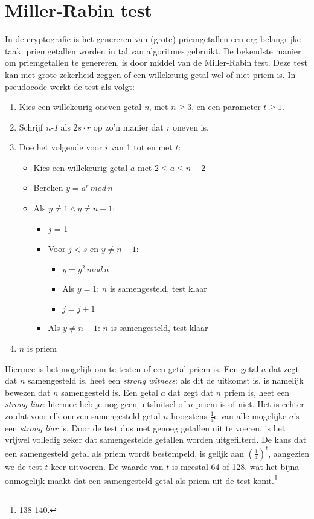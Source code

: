 \documentclass{report} %
\begin{document}
\section{Miller-Rabin test}
In de cryptografie is het genereren van (grote) priemgetallen een erg belangrijke taak: priemgetallen worden in tal van algoritmes gebruikt. De bekendste manier om priemgetallen te genereren, is door middel van de Miller-Rabin test. Deze test kan met grote zekerheid zeggen of een willekeurig getal wel of niet priem is. In pseudocode werkt de test als volgt:
\begin{enumerate}
    \item Kies een willekeurig oneven getal \textit{n}, met $n \geq 3$, en een parameter $t \geq 1$.
    \item Schrijf \textit{n-1} als $2s \cdot r$ op zo’n manier dat \textit{r} oneven is.
    \item Doe het volgende voor $i$ van 1 tot en met $t$:
    \begin{itemize}
        \item Kies een willekeurig getal $a$ met $2 \leq a \leq n-2$
        \item Bereken $y = a^r \,mod\, n$
        \item Als $y \neq 1 \wedge y \neq n-1$:
        \begin{itemize}
            \item $j$ = 1
            \item Voor $j<s$ en $y \neq n-1$:
            \begin{itemize}
                \item $y = y^2\, mod\, n$
                \item Als $y = 1$: $n$ is samengesteld, test klaar
                \item $j = j+1$
            \end{itemize}
            \item Als $y \neq n-1$: $n$ is samengesteld, test klaar
        \end{itemize}
    \end{itemize}
    \item $n$ is priem
\end{enumerate}
Hiermee is het mogelijk om te testen of een getal priem is. Een getal $a$ dat zegt dat $n$ samengesteld is, heet een \textit{strong witness}: als dit de uitkomst is, is namelijk bewezen dat $n$ samengesteld is. Een getal $a$ dat zegt dat $n$ priem is, heet een \textit{strong liar}: hiermee heb je nog geen uitsluitsel of $n$ priem is of niet. Het is echter zo dat voor elk oneven samengesteld getal $n$ hoogstens $\frac{1}{4}$e van alle mogelijke $a$’s een \textit{strong liar} is. Door de test dus met genoeg getallen uit te voeren, is het vrijwel volledig zeker dat samengestelde getallen worden uitgefilterd. De kans dat een samengesteld getal als priem wordt bestempeld, is gelijk aan $(\frac{1}{4})^t$, aangezien we de test $t$ keer uitvoeren. De waarde van $t$ is meestal 64 of 128, wat het bijna onmogelijk maakt dat een samengesteld getal als priem uit de test komt.\footnote{\cite{handbook_crypto} 138-140.}
\end{document}
